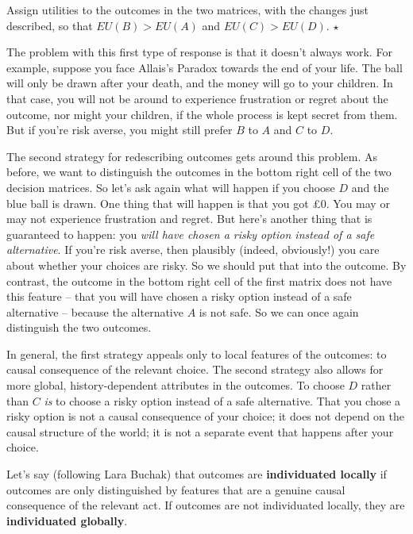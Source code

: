 \begin{exercise}
  Assign utilities to the outcomes in the two matrices, with the
  changes just described, so that $EU(B) > EU(A)$ and $EU(C) >
  EU(D)$. $\star$
\end{exercise}

The problem with this first type of response is that it doesn't always
work. For example, suppose you face Allais's Paradox towards the end
of your life. The ball will only be drawn after your death, and the
money will go to your children. In that case, you will not be around
to experience frustration or regret about the outcome, nor might your
children, if the whole process is kept secret from them. But if you're
risk averse, you might still prefer $B$ to $A$ and $C$ to
$D$.

The second strategy for redescribing outcomes gets around this
problem. As before, we want to distinguish the outcomes in the bottom
right cell of the two decision matrices. So let's ask again what will
happen if you choose $D$ and the blue ball is drawn. One thing that
will happen is that you got £0. You may or may not experience
frustration and regret. But here's another thing that is guaranteed to
happen: you \emph{will have chosen a risky option instead of a safe
  alternative}. If you're risk averse, then plausibly (indeed,
obviously!) you care about whether your choices are risky. So we
should put that into the outcome. By contrast, the outcome in the
bottom right cell of the first matrix does not have this feature --
that you will have chosen a risky option instead of a safe alternative
-- because the alternative $A$ is not safe.  So we can once again
distinguish the two outcomes.

In general, the first strategy appeals only to local features of the
outcomes: to causal consequence of the relevant choice. The second
strategy also allows for more global, history-dependent attributes in
the outcomes. To choose $D$ rather than $C$ \emph{is} to choose a
risky option instead of a safe alternative. That you chose a risky
option is not a causal consequence of your choice; it does not depend
on the causal structure of the world; it is not a separate event that
happens after your choice.

Let's say (following Lara Buchak) that outcomes are
\textbf{individuated locally} if outcomes are only distinguished by
features that are a genuine causal consequence of the relevant act. If
outcomes are not individuated locally, they are \textbf{individuated
  globally}. 

